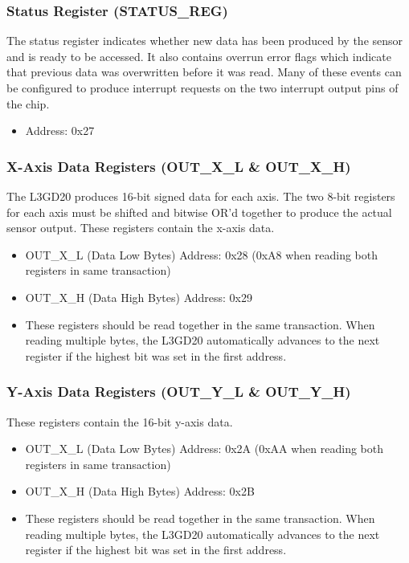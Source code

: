 \documentclass[11pt,fleqn]{book} %
\begin{document}
\subsubsection{Status Register (STATUS\_REG)}
The status register indicates whether new data has been produced by the sensor and is ready to be accessed. It also contains overrun error flags which indicate that previous data was overwritten before it was read. Many of these events can be configured to produce interrupt requests on the two interrupt output pins of the chip.
\begin{itemize}
    \item Address: 0x27
\end{itemize}

\subsubsection{X-Axis Data Registers (OUT\_X\_L \& OUT\_X\_H)}
The L3GD20 produces 16-bit signed data for each axis. The two 8-bit registers for each axis must be shifted and bitwise OR'd together to produce the actual sensor output. These registers contain the x-axis data. 
\begin{itemize}
    \item OUT\_X\_L (Data Low Bytes) Address: 0x28 (0xA8 when reading both registers in same transaction)
    \item OUT\_X\_H (Data High Bytes) Address: 0x29
    \item These registers should be read together in the same transaction. When reading multiple bytes, the L3GD20 automatically advances to the next register if the highest bit was set in the first address. 
\end{itemize} 

\subsubsection{Y-Axis Data Registers (OUT\_Y\_L \& OUT\_Y\_H)}
These registers contain the 16-bit y-axis data. 
\begin{itemize}
    \item OUT\_X\_L (Data Low Bytes) Address: 0x2A (0xAA when reading both registers in same transaction)
    \item OUT\_X\_H (Data High Bytes) Address: 0x2B
    \item These registers should be read together in the same transaction. When reading multiple bytes, the L3GD20 automatically advances to the next register if the highest bit was set in the first address. 
\end{itemize}
\end{document}
